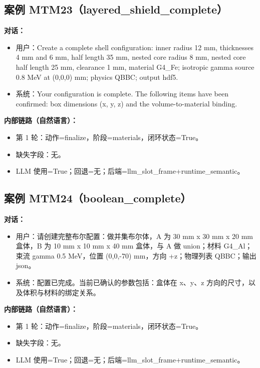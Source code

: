 \documentclass[11pt]{ctexart}
\begin{document}
\subsection{案例 MTM23（layered\_shield\_complete）}
\textbf{对话：}
\begin{itemize}
\item 用户：Create a complete shell configuration: inner radius 12 mm, thicknesses 4 mm and 6 mm, half length 35 mm, nested core radius 8 mm, nested core half length 25 mm, clearance 1 mm, material G4\_Fe; isotropic gamma source 0.8 MeV at (0,0,0) mm; physics QBBC; output hdf5.
\item 系统：Your configuration is complete. The following items have been confirmed: box dimensions (x, y, z) and the volume-to-material binding.
\end{itemize}
\textbf{内部链路（自然语言）：}
\begin{itemize}
\item 第 1 轮：动作=finalize，阶段=materials，闭环状态=True。
\item 缺失字段：无。
\item LLM 使用=True；回退=无；后端=llm\_slot\_frame+runtime\_semantic。
\end{itemize}
\subsection{案例 MTM24（boolean\_complete）}
\textbf{对话：}
\begin{itemize}
\item 用户：请创建完整布尔配置：做并集布尔体，A 为 30 mm x 30 mm x 20 mm 盒体，B 为 10 mm x 10 mm x 40 mm 盒体，与 A 做 union；材料 G4\_Al；束流 gamma 0.5 MeV，位置 (0,0,-70) mm，方向 +z；物理列表 QBBC；输出 json。
\item 系统：配置已完成。当前已确认的参数包括：盒体在 x、y、z 方向的尺寸，以及体积与材料的绑定关系。
\end{itemize}
\textbf{内部链路（自然语言）：}
\begin{itemize}
\item 第 1 轮：动作=finalize，阶段=materials，闭环状态=True。
\item 缺失字段：无。
\item LLM 使用=True；回退=无；后端=llm\_slot\_frame+runtime\_semantic。
\end{itemize}
\end{document}
